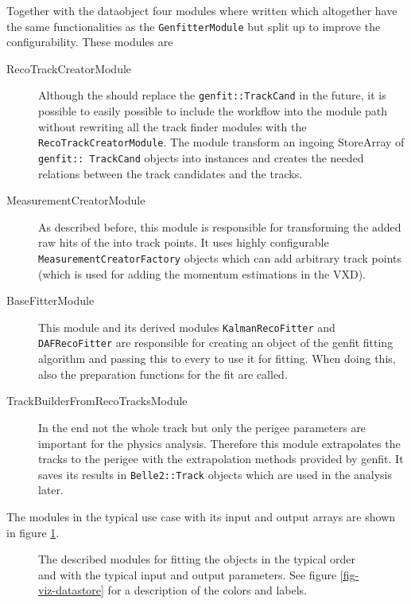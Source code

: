 Together with the \RecoTrack dataobject four modules where written which altogether have the same functionalities as the \texttt{GenfitterModule} but split up to improve the configurability. These modules are
\begin{description}
 \item[RecoTrackCreatorModule] Although the \RecoTrack should replace the \texttt{genfit::Track\-Cand} in the future, it is possible to easily possible to include the \RecoTrack workflow into the module path without rewriting all the track finder modules with the \texttt{Reco\-Track\-Creator\-Module}. The module transform an ingoing StoreArray of \texttt{genfit::\ Track\-Cand} objects into \RecoTrack instances and creates the needed relations between the track candidates and the tracks.
 \item[MeasurementCreatorModule] As described before, this module is responsible for transforming the added raw hits of the \RecoTrack into track points. It uses highly configurable \texttt{MeasurementCreatorFactory} objects which can add arbitrary track points (which is used for adding the momentum estimations in the VXD).
 \item[BaseFitterModule] This module and its derived modules \texttt{KalmanRecoFitter} and \texttt{DAF\-Reco\-Fitter} are responsible for creating an object of the genfit fitting algorithm and passing this to every \RecoTrack to use it for fitting. When doing this, also the preparation functions for the fit are called.
 \item[TrackBuilderFromRecoTracksModule] In the end not the whole track but only the perigee parameters are important for the physics analysis. Therefore this module extrapolates the tracks to the perigee with the extrapolation methods provided by genfit. It saves its results in \texttt{Belle2::Track} objects which are used in the analysis later.
\end{description}

The modules in the typical use case with its input and output arrays are shown in figure \ref{fig-reco-fitter-modules}.

\begin{figure}
  \centering
  \caption[Modules for fitting \RecoTrack objects.]{The described modules for fitting the \RecoTrack objects in the typical order and with the typical input and output parameters. See figure \ref{fig-viz-datastore} for a description of the colors and labels.}
  \label{fig-reco-fitter-modules}
\end{figure}


